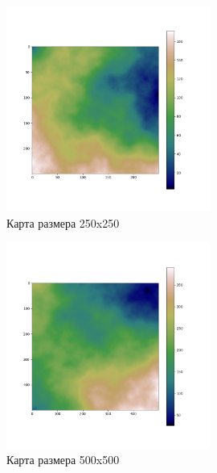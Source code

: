 \documentclass{article}
\numberwithin{equation}{section}
\begin{document}
			\begin{figure}[H]
				\centering
				\vspace{-0.5cm}
				\includegraphics[width=0.6\textwidth]{data/maps_example/250x250.png}
				\vspace{-0.5cm}
				\caption{Карта размера 250x250}\label{fig:map250}
			\end{figure}

			\begin{figure}[H]
				\centering
				\vspace{-0.5cm}
				\includegraphics[width=0.6\textwidth]{data/maps_example/500x500.png}
				\vspace{-0.5cm}
				\caption{Карта размера 500x500}\label{fig:map500}
			\end{figure}
\end{document}
